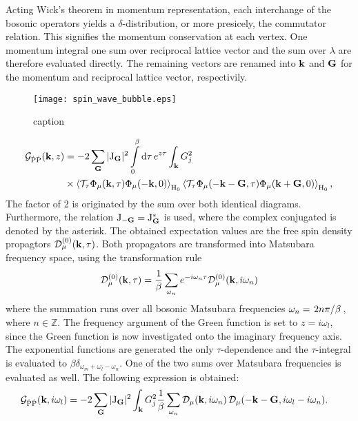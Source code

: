 Acting Wick's theorem in momentum representation, each interchange of the bosonic operators yields a $\delta$-distribution, or more presicely, the  commutator relation.
This signifies the momentum conservation at each vertex.
One momentum integral one sum over reciprocal lattice vector and the sum over $\lambda$ are therefore evaluated directly.
The remaining vectors are renamed into $\vb{k}$ and $\vb{G}$ for the momentum and reciprocal lattice vector, respectivily.
%
\begin{figure}
	\centering
	\texttt{[image: spin\_wave\_bubble.eps]}
	\caption{caption}
	\label{fig: spin wave bubble}
\end{figure}
%
%
\begin{align}
	\mathcal{G}_{\dot{\mathrm{P}}\dot{\mathrm{P}}}(\vb{k}, z) &= 
		-2 
		\sum\limits_{\vb{G}} 
		\vert \mathrm{J}_{\vb{G}} \vert^{2}
		\int\limits_{0}^{\beta} \dd{\tau} e^{z \tau} 
		\int_{\vb{k}} G_{j}^{2}
		\notag \\
		&\times
		\expval{\mathcal{T}_{\tau} \Phi_{\mu}(\vb{k},\tau) \Phi_{\mu}(-\vb{k},0)}_{\mathrm{H}_{0}} 
		\expval{\mathcal{T}_{\tau} \Phi_{\mu}(-\vb{k} - \vb{G},\tau) \Phi_{\mu}(\vb{k}+\vb{G},0)}_{\mathrm{H}_{0}},
\end{align}
%
The factor of 2 is originated by the sum over both identical diagrams.
Furthermore, the relation $\mathrm{J}_{-\vb{G}} = \mathrm{J}_{\vb{G}}^{*}$ is used, where the complex conjugated is denoted by the asterisk.
The obtained expectation values are the free spin density propagtors $\mathcal{D}_{\mu}^{(0)}(\vb{k},\tau)$.
Both propagators are transformed into Matsubara frequency space, using the transformation rule
%
\begin{align}
	\mathcal{D}_{\mu}^{(0)}(\vb{k},\tau) = \frac{1}{\beta} \sum\limits_{\omega_{n}} e^{-i\omega_{n}\tau} \mathcal{D}_{\mu}^{(0)}(\vb{k},i\omega_{n})
\end{align}
%
where the summation runs over all bosonic Matsubara frequencies $\omega_{n} = \flatfrac{2n\pi}{\beta}$, where $n\in\mathbb{Z}$.
The frequency argument of the Green function is set to $z = i\omega_{l}$, since the Green function is now investigated onto the imaginary frequency axis.
The exponential functions are generated the only $\tau$-dependence and the $\tau$-integral is evaluated to $\beta \delta_{\omega_{m}+\omega_{l}-\omega_{n}}$.
One of the two sums over Matsubara frequencies is evaluated as well.
The following expression is obtained:
%
\begin{align}
	\mathcal{G}_{\dot{\mathrm{P}}\dot{\mathrm{P}}}(\vb{k}, i\omega_{l}) &= 
		-2 
		\sum\limits_{\vb{G}} 
		\vert \mathrm{J}_{\vb{G}} \vert^{2}
		\int_{\vb{k}} G_{j}^{2}
		\frac{1}{\beta} \sum\limits_{\omega_{n}}
		\mathcal{D}_{\mu}(\vb{k},i\omega_{n}) \,
		\mathcal{D}_{\mu}(-\vb{k}-\vb{G},i\omega_{l}-i\omega_{n}).
		\label{appeq:Green function on the imaginary axis}
\end{align}
